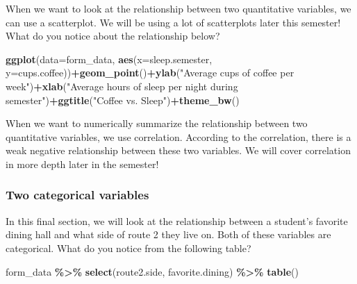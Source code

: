 \documentclass[
]{article}
\newenvironment{Shaded}{\begin{snugshade}}{\end{snugshade}}
\newcommand{\AttributeTok}[1]{\textcolor[rgb]{0.13,0.29,0.53}{#1}}
\newcommand{\FunctionTok}[1]{\textcolor[rgb]{0.13,0.29,0.53}{\textbf{#1}}}
\newcommand{\NormalTok}[1]{#1}
\newcommand{\SpecialCharTok}[1]{\textcolor[rgb]{0.81,0.36,0.00}{\textbf{#1}}}
\newcommand{\StringTok}[1]{\textcolor[rgb]{0.31,0.60,0.02}{#1}}
\begin{document}
When we want to look at the relationship between two quantitative
variables, we can use a scatterplot. We will be using a lot of
scatterplots later this semester! What do you notice about the
relationship below?

\begin{Shaded}
\begin{Highlighting}[]
\FunctionTok{ggplot}\NormalTok{(}\AttributeTok{data=}\NormalTok{form\_data, }\FunctionTok{aes}\NormalTok{(}\AttributeTok{x=}\NormalTok{sleep.semester, }\AttributeTok{y=}\NormalTok{cups.coffee))}\SpecialCharTok{+}\FunctionTok{geom\_point}\NormalTok{()}\SpecialCharTok{+}\FunctionTok{ylab}\NormalTok{(}\StringTok{"Average cups of coffee per week"}\NormalTok{)}\SpecialCharTok{+}\FunctionTok{xlab}\NormalTok{(}\StringTok{"Average hours of sleep per night during semester"}\NormalTok{)}\SpecialCharTok{+}\FunctionTok{ggtitle}\NormalTok{(}\StringTok{"Coffee vs. Sleep"}\NormalTok{)}\SpecialCharTok{+}\FunctionTok{theme\_bw}\NormalTok{()}
\end{Highlighting}
\end{Shaded}

When we want to numerically summarize the relationship between two
quantitative variables, we use correlation. According to the
correlation, there is a weak negative relationship between these two
variables. We will cover correlation in more depth later in the
semester!

\begin{Shaded}
\end{Shaded}

\subsubsection{Two categorical
variables}\label{two-categorical-variables}

In this final section, we will look at the relationship between a
student's favorite dining hall and what side of route 2 they live on.
Both of these variables are categorical. What do you notice from the
following table?

\begin{Shaded}
\begin{Highlighting}[]
\NormalTok{form\_data }\SpecialCharTok{\%\textgreater{}\%} \FunctionTok{select}\NormalTok{(route2.side, favorite.dining) }\SpecialCharTok{\%\textgreater{}\%} \FunctionTok{table}\NormalTok{()}
\end{Highlighting}
\end{Shaded}
\end{document}

